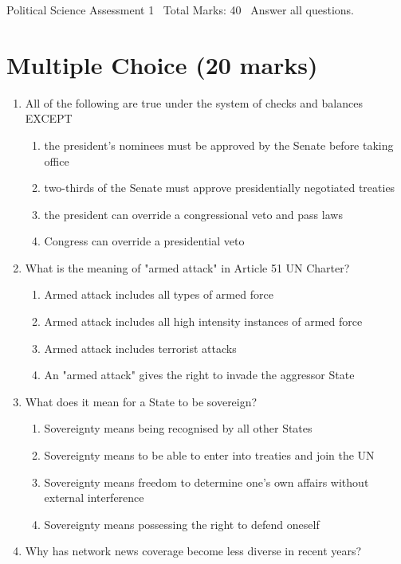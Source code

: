 \documentclass[12pt]{article}
\begin{document}
\begin{center}
Political Science Assessment 1 \
Total Marks: 40 \
Answer all questions.
\end{center}

\section*{Multiple Choice (20 marks)}
\begin{enumerate}[label=\arabic*.]
\item All of the following are true under the system of checks and balances EXCEPT
\begin{enumerate}[label=(\alph*)]
    \item the president's nominees must be approved by the Senate before taking office
    \item two-thirds of the Senate must approve presidentially negotiated treaties
    \item the president can override a congressional veto and pass laws
    \item Congress can override a presidential veto
\end{enumerate}
\item What is the meaning of "armed attack" in Article 51 UN Charter?
\begin{enumerate}[label=(\alph*)]
    \item Armed attack includes all types of armed force
    \item Armed attack includes all high intensity instances of armed force
    \item Armed attack includes terrorist attacks
    \item An "armed attack" gives the right to invade the aggressor State
\end{enumerate}
\item What does it mean for a State to be sovereign?
\begin{enumerate}[label=(\alph*)]
    \item Sovereignty means being recognised by all other States
    \item Sovereignty means to be able to enter into treaties and join the UN
    \item Sovereignty means freedom to determine one's own affairs without external interference
    \item Sovereignty means possessing the right to defend oneself
\end{enumerate}
\item Why has network news coverage become less diverse in recent years?

\end{enumerate}
\end{document}

